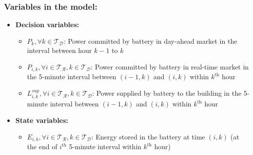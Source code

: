 \documentclass[11pt,twoside]{article}
\begin{document}
\subsubsection{Variables in the model:}
\begin{itemize}
\item \textbf{Decision variables:}
\begin{itemize}
\item[\textbullet] $P_{k}, \forall k \in \mathcal{T_D}$: Power committed by battery in day-ahead market in the interval between hour $k-1$ to $k$
\item[\textbullet] $P_{i,k}, \forall i \in \mathcal{T_R}, k \in \mathcal{T_D}$: Power committed by battery in real-time market in the 5-minute interval between $(i-1,k)$ and $(i,k)$ within $k^\text{th}$ hour
\item[\textbullet] $L^{sup}_{i,k}, \forall i \in \mathcal{T_R}, k \in \mathcal{T_D}$: Power supplied by battery to the building in the 5-minute interval between $(i-1,k)$ and $(i,k)$ within $k^\text{th}$ hour 
\end{itemize}
\item \textbf{State variables:}
\begin{itemize}
\item[\textbullet] $E_{i,k}, \forall i \in \mathcal{T_R}, k \in \mathcal{T_D}$: Energy stored in the battery at time $(i,k)$ (at the end of $i^{th}$ 5-minute interval within $k^\text{th}$ hour) 
\end{itemize}
\end{itemize}
\end{document}
